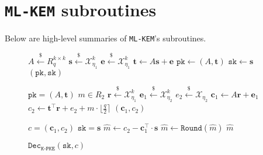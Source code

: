 \documentclass[runningheads]{llncs}
\newcommand{\keygen}{\texttt{KeyGen}}
\newcommand{\encrypt}{\texttt{Enc}}
\newcommand{\decrypt}{\texttt{Dec}}
\newcommand{\pk}{\texttt{pk}}
\newcommand{\sk}{\texttt{sk}}
\newcommand{\leftsample}{\stackrel{\$}{\leftarrow}}
\begin{document}



\appendix
\section{\texttt{ML-KEM} subroutines}
Below are high-level summaries of \texttt{ML-KEM}'s subroutines.

\begin{figure}[h]
    \centering

    \begin{minipage}[t]{0.33\textwidth}
        \begin{algorithm}[H]
            \caption*{$\keygen_\texttt{K-PKE}$}
            \begin{algorithmic}[1]
                \State $A \leftsample R_q^{k \times k}$
                \State $\mathbf{s} \leftsample \mathcal{X}_{\eta_1}^k$
                \State $\mathbf{e} \leftsample \mathcal{X}_{\eta_1}^k$
                \State $\mathbf{t} \leftarrow A\mathbf{s} + \mathbf{e}$
                \State $\pk \leftarrow (A, \mathbf{t})$
                \State $\sk \leftarrow \mathbf{s}$
                \State \Return $(\pk, \sk)$
            \end{algorithmic}
        \end{algorithm}
    \end{minipage}\hfill
    \begin{minipage}[t]{0.33\textwidth}
        \begin{algorithm}[H]
            \caption*{$\encrypt_\texttt{K-PKE}(\pk, m)$}
            \begin{algorithmic}[1]
                \Ensure $\pk = (A, \mathbf{t})$
                \Ensure $m \in R_2$
                \State $\mathbf{r} \leftsample \mathcal{X}_{\eta_1}^k$
                \State $\mathbf{e}_1 \leftsample \mathcal{X}_{\eta_2}^k$
                \State $e_2 \leftsample \mathcal{X}_{\eta_2}$
                \State $\mathbf{c}_1 \leftarrow A\mathbf{r} + \mathbf{e}_1$
                \State $c_2 \leftarrow \mathbf{t}^\intercal \mathbf{r} + e_2 + m \cdot \lfloor \frac{q}{2}\rceil$
                \State \Return $(\mathbf{c}_1, c_2)$
            \end{algorithmic}
        \end{algorithm}
    \end{minipage}\hfill
    \begin{minipage}[t]{0.3\textwidth}
        \begin{algorithm}[H]
            \caption*{$\decrypt_\texttt{K-PKE}(\sk, c)$}
            \begin{algorithmic}[1]
                \Ensure $c = (\mathbf{c}_1, c_2)$
                \Ensure $\sk = \mathbf{s}$
                \State $\hat{m} \leftarrow c_2 - \mathbf{c}_1^\intercal \cdot \mathbf{s}$
                \State $\hat{m} \leftarrow \texttt{Round}(\hat{m})$
                \State \Return $\hat{m}$
            \end{algorithmic}
        \end{algorithm}
    \end{minipage}
    

\end{figure}
\end{document}
